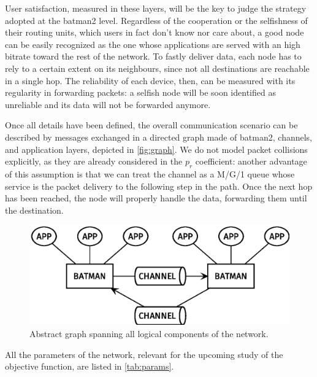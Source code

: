 \documentclass[conference,10.5pt]{IEEEtran}
\begin{document}
User satisfaction, measured in these layers, will be the key to judge the strategy adopted at the \gls{batman2} level.
Regardless of the cooperation or the selfishness of their routing units, which users in fact don't know nor care about, a good node can be easily recognized as the one whose applications are served with an high bitrate toward the rest of the network.
To fastly deliver data, each node has to rely to a certain extent on its neighbours, since not all destinations are reachable in a single hop.
The reliability of each device, then, can be measured with its regularity in forwarding packets: a selfish node will be soon identified as unreliable and its data will not be forwarded anymore.

\smallskip
Once all details have been defined, the overall communication scenario can be described by messages exchanged in a directed graph made of \gls{batman2}, channels, and application layers, depicted in \autoref{fig:graph}.
We do not model packet collisions explicitly, as they are already considered in the $p_r$ coefficient: another advantage of this assumption is that we can treat the channel as a M/G/1 queue whose service is the packet delivery to the following step in the path.
Once the next hop has been reached, the node will properly handle the data, forwarding them until the destination.

\begin{figure}[h]
  \centering
  \includegraphics[width=\linewidth]{figures/layers_diagram}
  \caption{Abstract graph spanning all logical components of the network.}
  \label{fig:graph}
\end{figure}

All the parameters of the network, relevant for the upcoming study of the objective function, are listed in \autoref{tab:params}.

\renewcommand\theadalign{l}
\end{document}
